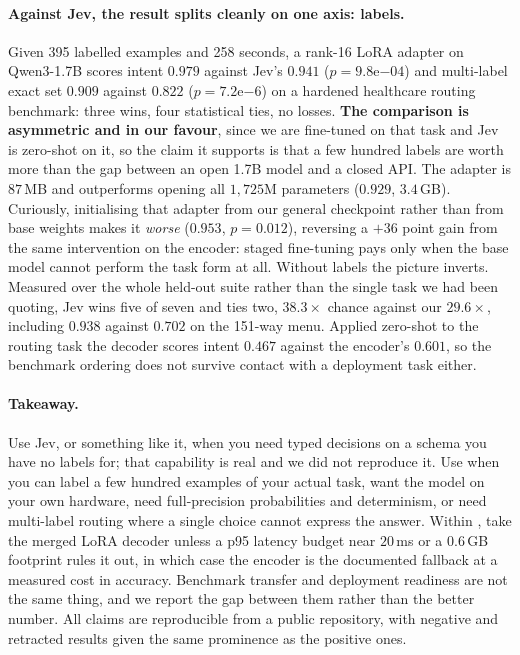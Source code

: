 \paragraph{Against Jev, the result splits cleanly on one axis: labels.}
Given 395 labelled examples and 258 seconds, a rank-16 LoRA adapter on
Qwen3-1.7B scores intent $0.979$ against Jev's $0.941$
($p=9.8\mathrm{e}{-04}$) and multi-label exact set $0.909$ against $0.822$
($p=7.2\mathrm{e}{-6}$) on a hardened healthcare routing benchmark: three
wins, four statistical ties, no losses. \textbf{The comparison is
asymmetric and in our favour}, since we are fine-tuned on that task and
Jev is zero-shot on it, so the claim it supports is that a few hundred
labels are worth more than the gap between an open 1.7B model and a
closed API. The adapter is $87$\,MB and outperforms opening all
$1{,}725$M parameters ($0.929$, $3.4$\,GB). Curiously, initialising that
adapter from our general checkpoint rather than from base weights makes
it \emph{worse} ($0.953$, $p=0.012$), reversing a $+36$ point gain from
the same intervention on the encoder: staged fine-tuning pays only when
the base model cannot perform the task form at all. Without labels the
picture inverts. Measured over the whole held-out suite rather than the
single task we had been quoting, Jev wins five of seven and ties two,
$38.3\times$ chance against our $29.6\times$, including $0.938$ against
$0.702$ on the 151-way menu. Applied zero-shot to the routing task the
decoder scores intent $0.467$ against the encoder's $0.601$, so the
benchmark ordering does not survive contact with a deployment task
either.

\paragraph{Takeaway.} Use Jev, or something like it, when you need typed
decisions on a schema you have no labels for; that capability is real and
we did not reproduce it. Use \openjev{} when you can label a few hundred
examples of your actual task, want the model on your own hardware, need
full-precision probabilities and determinism, or need multi-label routing
where a single choice cannot express the answer. Within \openjev{}, take
the merged LoRA decoder unless a p95 latency budget near $20$\,ms or a
$0.6$\,GB footprint rules it out, in which case the encoder is the
documented fallback at a measured cost in accuracy. Benchmark transfer and
deployment readiness are not the same thing, and we report the gap between
them rather than the better number. All claims are reproducible from a
public repository, with negative and retracted results given the same
prominence as the positive ones.
